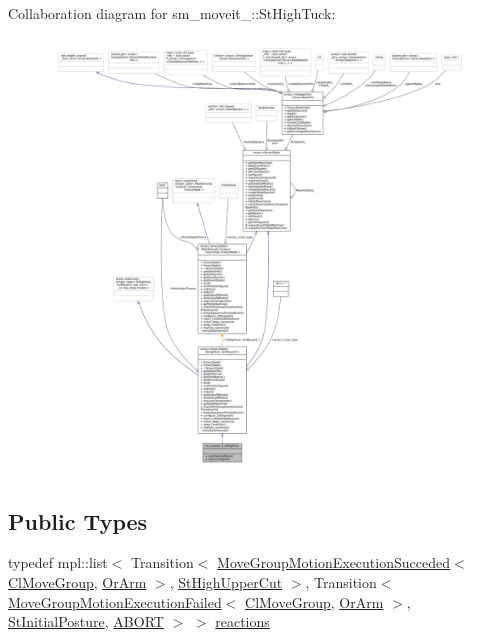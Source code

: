 Collaboration diagram for sm\+\_\+moveit\+\_\+:\+:St\+High\+Tuck\+:
\nopagebreak
\begin{figure}[H]
\begin{center}
\leavevmode
\includegraphics[width=350pt]{structsm__moveit__3_1_1StHighTuck__coll__graph}
\end{center}
\end{figure}
\subsection*{Public Types}
\begin{DoxyCompactItemize}
\item 
typedef mpl\+::list$<$ Transition$<$ \hyperlink{structmoveit__z__client_1_1MoveGroupMotionExecutionSucceded}{Move\+Group\+Motion\+Execution\+Succeded}$<$ \hyperlink{classmoveit__z__client_1_1ClMoveGroup}{Cl\+Move\+Group}, \hyperlink{classsm__moveit__3_1_1OrArm}{Or\+Arm} $>$, \hyperlink{structsm__moveit__3_1_1StHighUpperCut}{St\+High\+Upper\+Cut} $>$, Transition$<$ \hyperlink{structmoveit__z__client_1_1MoveGroupMotionExecutionFailed}{Move\+Group\+Motion\+Execution\+Failed}$<$ \hyperlink{classmoveit__z__client_1_1ClMoveGroup}{Cl\+Move\+Group}, \hyperlink{classsm__moveit__3_1_1OrArm}{Or\+Arm} $>$, \hyperlink{structsm__moveit__3_1_1StInitialPosture}{St\+Initial\+Posture}, \hyperlink{classABORT}{A\+B\+O\+RT} $>$ $>$ \hyperlink{structsm__moveit__3_1_1StHighTuck_a26830b344af16cd0a5f59f72c125a289}{reactions}
\end{DoxyCompactItemize}
